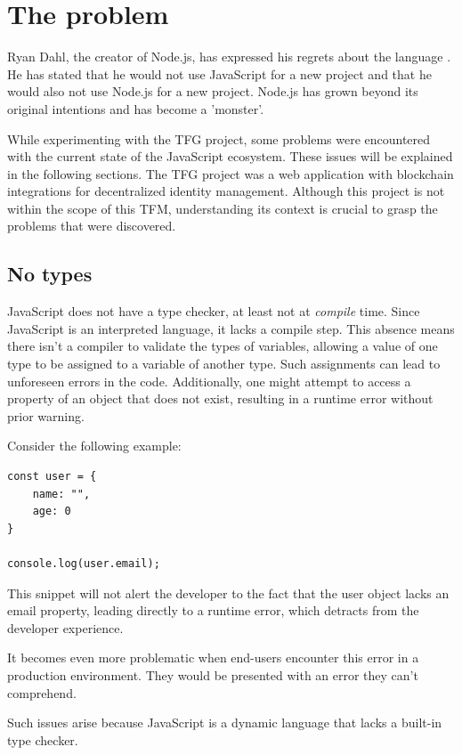 \documentclass[10pt,journal,compsoc]{IEEEtran}
\begin{document}
\section{The problem}

Ryan Dahl, the creator of Node.js, has expressed his regrets about the language \cite{FKNODE}. He has stated that he would not use JavaScript for a new project and that he would also not use Node.js for a new project. Node.js has grown beyond its original intentions and has become a 'monster'.

While experimenting with the TFG \cite{TFG} project, some problems were encountered with the current state of the JavaScript ecosystem. These issues will be explained in the following sections. The TFG project was a web application with blockchain integrations for decentralized identity management. Although this project is not within the scope of this TFM, understanding its context is crucial to grasp the problems that were discovered.


\subsection{No types}
JavaScript does not have a type checker, at least not at \textit{compile} time. Since JavaScript is an interpreted language, it lacks a compile step. This absence means there isn't a compiler to validate the types of variables, allowing a value of one type to be assigned to a variable of another type. Such assignments can lead to unforeseen errors in the code. Additionally, one might attempt to access a property of an object that does not exist, resulting in a runtime error without prior warning.

Consider the following example:
\begin{lstlisting}
const user = {
    name: "",
    age: 0
}
    
console.log(user.email);
\end{lstlisting}

This snippet will not alert the developer to the fact that the user object lacks an email property, leading directly to a runtime error, which detracts from the developer experience.

It becomes even more problematic when end-users encounter this error in a production environment. They would be presented with an error they can't comprehend.

Such issues arise because JavaScript is a dynamic language that lacks a built-in type checker.
\end{document}
